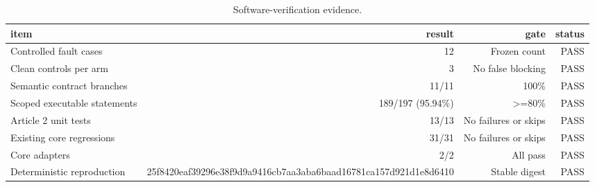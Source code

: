 \begin{table}[htbp]
\centering
\caption{Software-verification evidence.}
\label{tab:verification}
\begin{tabular}{lrrr}
\hline
item & result & gate & status \\
\hline
Controlled fault cases & 12 & Frozen count & PASS \\
Clean controls per arm & 3 & No false blocking & PASS \\
Semantic contract branches & 11/11 & 100\% & PASS \\
Scoped executable statements & 189/197 (95.94\%) & >=80\% & PASS \\
Article 2 unit tests & 13/13 & No failures or skips & PASS \\
Existing core regressions & 31/31 & No failures or skips & PASS \\
Core adapters & 2/2 & All pass & PASS \\
Deterministic reproduction & 25f8420eaf39296e38f9d9a9416cb7aa3aba6baad16781ca157d921d1e8d6410 & Stable digest & PASS \\
\hline
\end{tabular}
\end{table}
